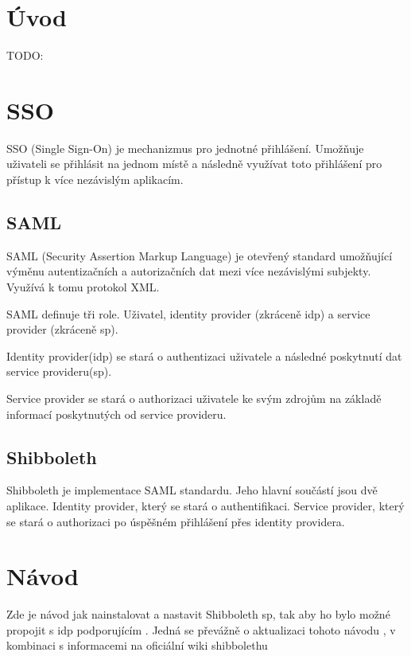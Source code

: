 \chapter{Úvod}

TODO:
\chapter{SSO}
\label{sso}
SSO (Single Sign-On) je mechanizmus pro jednotné přihlášení. Umožňuje uživateli se přihlásit na jednom místě a následně využívat toto přihlášení pro přístup k více nezávislým aplikacím. \cite{SSO}


\section{SAML}

SAML\cite{SAMLofficialSite}\cite{WhatIsSaml} (Security Assertion Markup Language) je otevřený standard umožňující výměnu autentizačních a autorizačních dat mezi více nezávislými subjekty. Využívá k tomu protokol XML. 

SAML definuje tři role. Uživatel, identity provider (zkráceně idp) a service provider (zkráceně sp). 

Identity provider(idp) se stará o authentizaci uživatele a následné poskytnutí dat service provideru(sp).

Service provider se stará o authorizaci uživatele ke svým zdrojům na základě informací poskytnutých od service provideru.


\section{Shibboleth}

Shibboleth je implementace SAML standardu. Jeho hlavní součástí jsou dvě aplikace. Identity provider, který se stará o authentifikaci. Service provider, který se stará o authorizaci po úspěšném přihlášení přes identity providera. \cite{shibbolethWiki}

\chapter{Návod}
\label{návod}

Zde je návod jak nainstalovat a nastavit Shibboleth sp, tak aby ho bylo možné propojit s idp podporujícím . Jedná se převážně o aktualizaci tohoto návodu \cite{shibbolethSpInstallation}, v kombinaci s informacemi na oficiální wiki shibbolethu\cite{shibbolethWikiSP}

